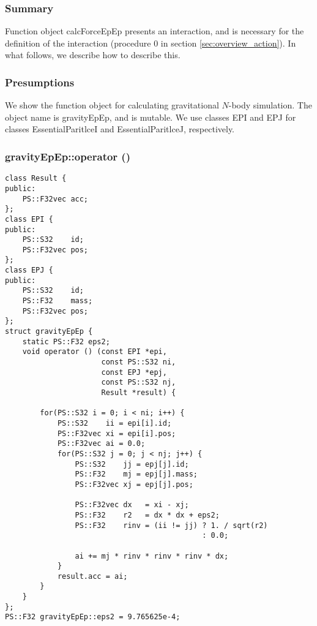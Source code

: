 \subsubsection{Summary}

Function object calcForceEpEp presents an interaction, and is
necessary for the definition of the interaction (procedure 0 in
section \ref{sec:overview_action}). In what follows, we describe how
to describe this.

\subsubsection{Presumptions}

We show the function object for calculating gravitational $N$-body
simulation. The object name is gravityEpEp, and is mutable. We use
classes EPI and EPJ for classes EssentialParitlceI and
EssentialParitlceJ, respectively.

\subsubsection{gravityEpEp::operator ()}

\begin{lstlisting}[caption=calcForceEpEp]
class Result {
public:
    PS::F32vec acc;
};
class EPI {
public:
    PS::S32    id;
    PS::F32vec pos;
};
class EPJ {
public:
    PS::S32    id;
    PS::F32    mass;
    PS::F32vec pos;
};
struct gravityEpEp {
    static PS::F32 eps2;
    void operator () (const EPI *epi,
                      const PS::S32 ni,
                      const EPJ *epj,
                      const PS::S32 nj,
                      Result *result) {

        for(PS::S32 i = 0; i < ni; i++) {
            PS::S32    ii = epi[i].id;
            PS::F32vec xi = epi[i].pos;
            PS::F32vec ai = 0.0;
            for(PS::S32 j = 0; j < nj; j++) {
                PS::S32    jj = epj[j].id;
                PS::F32    mj = epj[j].mass;
                PS::F32vec xj = epj[j].pos;

                PS::F32vec dx   = xi - xj;
                PS::F32    r2   = dx * dx + eps2;
                PS::F32    rinv = (ii != jj) ? 1. / sqrt(r2)
                                             : 0.0;

                ai += mj * rinv * rinv * rinv * dx;
            }
            result.acc = ai;
        }
    }
};
PS::F32 gravityEpEp::eps2 = 9.765625e-4;
\end{lstlisting}

